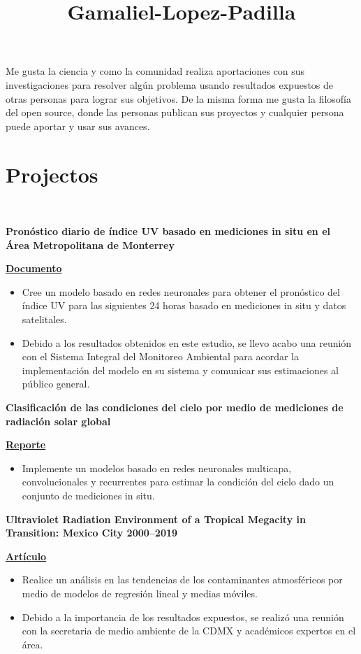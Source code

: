 \documentclass[a3paper]{adcv_color}
\title{Gamaliel-Lopez-Padilla}
\newcommand{\proyect}[5]{\begin{minipage}{1\linewidth}
		\begin{minipage}{1\linewidth}
			\textbf{#1}
		\end{minipage}
	\end{minipage}
	\href{#4}{\textbf{#5}}
	\vspace{-1cm}\\
}
\begin{document}
\changefontsizes{16pt}
\begin{flushleft}
	Me gusta la ciencia y como la comunidad realiza  aportaciones con sus investigaciones para resolver algún problema usando resultados expuestos de otras personas para lograr sus objetivos. De la misma forma me gusta la filosofía del open source, donde las personas publican sus proyectos y cualquier persona puede aportar y usar sus avances.\\
\end{flushleft}

\section{Projectos}\\

\proyect{Pronóstico diario de índice UV basado en mediciones in situ en el Área Metropolitana de Monterrey}{Octubre 2023}{-0.8}{https://raw.githubusercontent.com/giovannilopez9808/Documents/master/Tesis/main.pdf}{Documento}
\begin{itemize}
	\setlength\itemsep{0em}
	\item Cree un modelo basado en redes neuronales para obtener el pronóstico del índice UV para las siguientes 24 horas basado en mediciones in situ y datos satelitales.
	\item Debido a los resultados obtenidos en este estudio, se llevo acabo una reunión con el Sistema Integral del Monitoreo Ambiental para acordar la implementación del modelo en su sistema y comunicar sus estimaciones al público general.
\end{itemize}
\proyect{Clasificación de las condiciones del cielo por medio de mediciones de radiación solar global}{Junio 2022}{-0.8}{https://github.com/giovannilopez9808/Cloud_classification/raw/main/Document/Main.pdf}{Reporte}
\begin{itemize}
	\setlength\itemsep{0em}
	\item Implemente un modelos basado en redes neuronales multicapa, convolucionales y recurrentes para estimar la condición del cielo dado un conjunto de mediciones in situ.
\end{itemize}
\proyect{Ultraviolet Radiation Environment of a Tropical Megacity in Transition: Mexico City 2000–2019}{Agosto 2021}{-0.6}{https://pubs.acs.org/doi/10.1021/acs.est.0c08515}{Artículo}
\begin{itemize}
	\setlength\itemsep{0em}
	\item Realice un análisis en las tendencias de los contaminantes atmosféricos por medio de modelos de regresión lineal y medias móviles.
	\item Debido a la importancia de los resultados expuestos, se realizó una reunión con la secretaria de medio ambiente de la CDMX y académicos expertos en el área.
\end{itemize}
\end{document}
